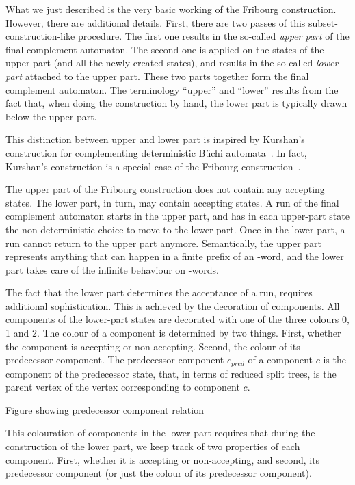 What we just described is the very basic working of the Fribourg construction. However, there are additional details. First, there are two passes of this subset-construction-like procedure. The first one results in the so-called \textit{upper part} of the final complement automaton. The second one is applied on the states of the upper part (and all the newly created states), and results in the so-called \textit{lower part} attached to the upper part. These two parts together form the final complement automaton. The terminology ``upper'' and ``lower'' results from the fact that, when doing the construction by hand, the lower part is typically drawn below the upper part.

This distinction between upper and lower part is inspired by Kurshan's construction for complementing deterministic Büchi automata~\cite{Kurshan198759}. In fact, Kurshan's construction is a special case of the Fribourg construction~\cite{2014_joel_ulrich}.

The upper part of the Fribourg construction does not contain any accepting states. The lower part, in turn, may contain accepting states. A run of the final complement automaton starts in the upper part, and has in each upper-part state the non-deterministic choice to move to the lower part. Once in the lower part, a run cannot return to the upper part anymore. Semantically, the upper part represents anything that can happen in a finite prefix of an \om-word, and the lower part takes care of the infinite behaviour on \om-words.

The fact that the lower part determines the acceptance of a run, requires additional sophistication. This is achieved by the decoration of components. All components of the lower-part states are decorated with one of the three colours 0, 1 and 2. The colour of a component is determined by two things. First, whether the component is accepting or non-accepting. Second, the colour of its predecessor component. The predecessor component $c_{pred}$ of a component $c$ is the component of the predecessor state, that, in terms of reduced split trees, is the parent vertex of the vertex corresponding to component $c$.

Figure showing predecessor component relation

This colouration of components in the lower part requires that during the construction of the lower part, we keep track of two properties of each component. First, whether it is accepting or non-accepting, and second, its predecessor component (or just the colour of its predecessor component).

